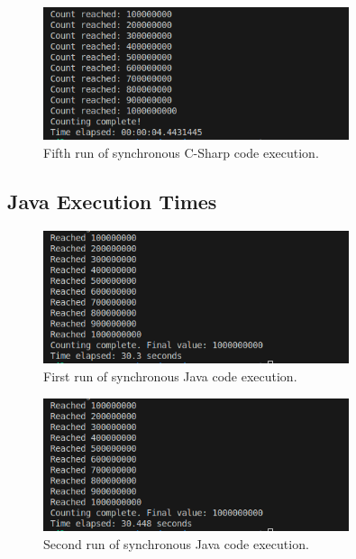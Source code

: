 \documentclass[12pt,a4paper]{article}
\begin{document}
\begin{figure}[htbp]
    \centering
    \includegraphics[width=0.8\textwidth]{../sync_records/results_cs/result_5.png}
    \caption{Fifth run of synchronous C-Sharp code execution.}
    \label{fig:C-Sharp-runtime-5}
\end{figure}

\clearpage
\subsection{Java Execution Times} 

\begin{figure}[htbp]
    \centering
    \includegraphics[width=0.8\textwidth]{../sync_records/results_java/result_1.png}
    \caption{First run of synchronous Java code execution.}
    \label{fig:Java-runtime-1}
\end{figure}

\begin{figure}[htbp]
    \centering
    \includegraphics[width=0.8\textwidth]{../sync_records/results_java/result_2.png}
    \caption{Second run of synchronous Java code execution.}
    \label{fig:Java-runtime-2}
\end{figure}
\end{document}
